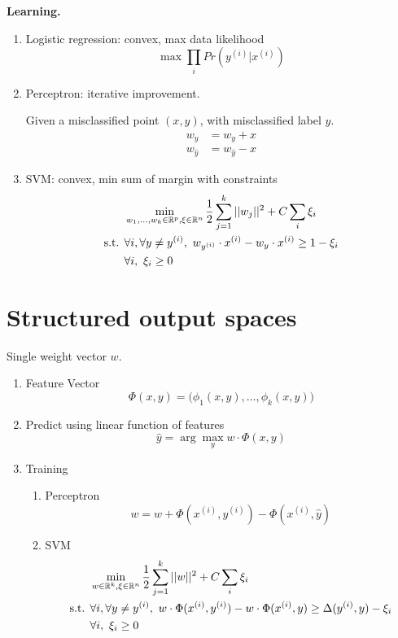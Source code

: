 \documentclass[a4paper]{report}
\begin{document}
\textbf{Learning.}
\begin{enumerate}
\item Logistic regression: convex, max data likelihood
$$
\max \prod_i Pr(y^{(i)}|x^{(i)})
$$
\item Perceptron: iterative improvement.

Given a misclassified point $(x, y)$, with misclassified label $\hat y$.
\begin{align*}
w_y &= w_y + x \\
w_{\hat y} &= w_{\hat y} - x
\end{align*}
\item SVM: convex, min sum of margin with constraints
\begin{align*}
&\min_{w_1, ..., w_k \in \mathbb{R}^p, \xi\in \mathbb{R}^n} \frac{1}{2}\sum_{j=1}^k ||w_j||^2+C\sum_i \xi_i \\
\text{s.t. } &\forall i, \forall y \neq y^{(i)},~ w_{y^{(i)}}\cdot x^{(i)} - w_y \cdot x^{(i)} \geq 1-\xi_i \\
& \forall i,~ \xi_i\geq0
\end{align*}
\end{enumerate}

\section{Structured output spaces}
Single weight vector $w$. 
\begin{enumerate}
\item Feature Vector
$$
\Phi(x, y) = \big(\phi_1(x,y),...,\phi_k(x, y)\big)
$$
\item Predict using linear function of features 
$$
\hat y = \arg\max_y w\cdot \Phi(x, y)
$$
\item Training 
\begin{enumerate}
\item Perceptron
$$
w = w + \Phi(x^{(i)}, y^{(i)})-\Phi(x^{(i)}, \hat y)
$$

\item SVM
\begin{align*}
&\min_{w \in \mathbb{R}^k, \xi\in \mathbb{R}^n} \frac{1}{2}\sum_{j=1}^k ||w||^2+C\sum_i
\xi_i \\
\text{s.t. } &\forall i, \forall y \neq y^{(i)},~  w\cdot \Phi(x^{(i)}, y^{(i)})-w\cdot \Phi(x^{(i)}, y)\geq \Delta(y^{(i)}, y)-\xi_i \\
& \forall i,~ \xi_i\geq0
\end{align*}
\end{enumerate}
\end{enumerate}
\end{document}
